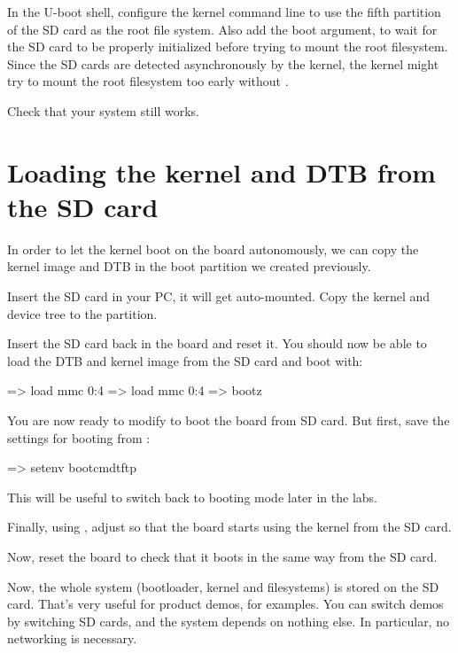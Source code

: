 In the U-boot shell, configure the kernel command line to use the
fifth partition of the SD card as the root file system. Also add the
 boot argument, to wait for the SD card to be properly
initialized before trying to mount the root filesystem. Since the SD
cards are detected asynchronously by the kernel, the kernel might try
to mount the root filesystem too early without .

Check that your system still works.

\section{Loading the kernel and DTB from the SD card}

In order to let the kernel boot on the board autonomously, we can
copy the kernel image and DTB in the boot partition we created
previously.

Insert the SD card in your PC, it will get auto-mounted. Copy the
kernel and device tree to the  partition.

Insert the SD card back in the board and reset it. You should now be
able to load the DTB and kernel image from the SD card and boot with:

\begin{ubootinput}
=> load mmc 0:4 %
=> load mmc 0:4 %
=> bootz %
\end{ubootinput}

You are now ready to modify  to boot the board
from SD card. But first, save the settings for booting from
:

\begin{ubootinput}
=> setenv bootcmdtftp %
\end{ubootinput}

This will be useful to switch back to  booting mode
later in the labs.

Finally, using , adjust  so that
the board starts using the kernel from the SD card.

Now, reset the board to check that it boots in the same way from the
SD card.

Now, the whole system (bootloader, kernel and filesystems) is
stored on the SD card. That's very useful for product demos, for
examples. You can switch demos by switching SD cards, and the
system depends on nothing else. In particular, no networking is
necessary.
